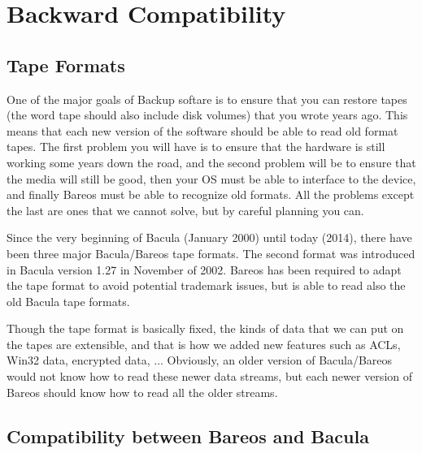 \chapter{Backward Compatibility}
\label{backward-compability}

\section{Tape Formats}
\label{backward-compability-tape-format}


One of the major goals of Backup softare is to ensure that you can restore
tapes (the word tape should also include disk volumes) that you wrote years
ago.  This means that each new version of the software should be able to read old
format tapes. The first problem you will have is to ensure that the
hardware is still working some years down the road, and the second
problem will be to ensure that the media will still be good, then
your OS must be able to interface to the device, and finally Bareos
must be able to recognize old formats.  All the problems except the
last are ones that we cannot solve, but by careful planning you can.

Since the very beginning of Bacula (January 2000) until today (2014),
there have been three major Bacula/Bareos tape formats.  The second format
was introduced in Bacula version 1.27 in November of 2002.
Bareos has been required to adapt the tape format to avoid potential trademark issues,
but is able to read also the old Bacula tape formats.

Though the tape format is basically fixed, the kinds of data that we can put on the
tapes are extensible, and that is how we added new features
such as ACLs, Win32 data, encrypted data, ...  Obviously, an older
version of Bacula/Bareos would not know how to read these newer data streams,
but each newer version of Bareos should know how to read all the
older streams.

%
%
%

\section{Compatibility between Bareos and Bacula}
\label{compat-bacula}

